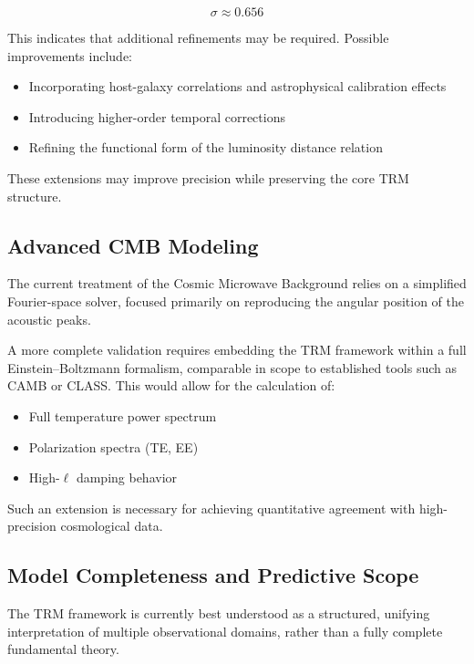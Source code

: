 \documentclass[11pt]{article}
\begin{document}
\begin{equation}
	\sigma \approx 0.656
\end{equation}

This indicates that additional refinements may be required. Possible improvements include:

\begin{itemize}
	\item Incorporating host-galaxy correlations and astrophysical calibration effects
	\item Introducing higher-order temporal corrections
	\item Refining the functional form of the luminosity distance relation
\end{itemize}

These extensions may improve precision while preserving the core TRM structure.

\subsection{Advanced CMB Modeling}

The current treatment of the Cosmic Microwave Background relies on a simplified Fourier-space solver, focused primarily on reproducing the angular position of the acoustic peaks.

A more complete validation requires embedding the TRM framework within a full Einstein--Boltzmann formalism, comparable in scope to established tools such as CAMB or CLASS. This would allow for the calculation of:

\begin{itemize}
	\item Full temperature power spectrum
	\item Polarization spectra (TE, EE)
	\item High-$\ell$ damping behavior
\end{itemize}

Such an extension is necessary for achieving quantitative agreement with high-precision cosmological data.

\subsection{Model Completeness and Predictive Scope}

The TRM framework is currently best understood as a structured, unifying interpretation of multiple observational domains, rather than a fully complete fundamental theory.
\end{document}
